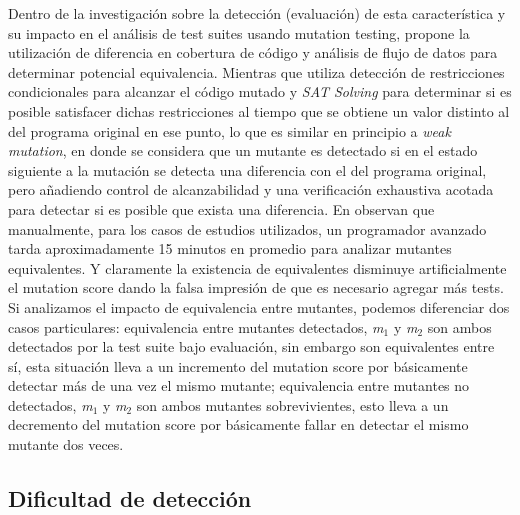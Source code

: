 Dentro de la investigaci\'on sobre la detecci\'on (evaluaci\'on) de esta caracter\'istica y su impacto en el an\'alisis de test suites usando mutation testing, \cite{biblography.mutation.evaluation.equivalent.Schuler+10} propone la utilizaci\'on de diferencia en cobertura de c\'odigo y an\'alisis de flujo de datos para determinar potencial equivalencia. Mientras que  \cite{biblography.mutation.evaluation.equivalent.Just+13} utiliza detecci\'on de restricciones condicionales para alcanzar el c\'odigo mutado y \emph{SAT Solving} para determinar si es posible satisfacer dichas restricciones al tiempo que se obtiene un valor distinto al del programa original en ese punto, lo que es similar en principio a \emph{weak mutation}, en donde se considera que un mutante es detectado si en el estado siguiente a la mutaci\'on se detecta una diferencia con el del programa original, pero a\~nadiendo control de alcanzabilidad y una verificaci\'on exhaustiva acotada para detectar si es posible que exista una diferencia.
En \cite{biblography.mutation.evaluation.equivalent.Grun+09} observan que manualmente, para los casos de estudios utilizados, un programador avanzado tarda aproximadamente 15 minutos en promedio para analizar mutantes equivalentes. Y claramente la existencia de equivalentes disminuye artificialmente el mutation score dando la falsa impresi\'on de que es necesario agregar m\'as tests. Si analizamos el impacto de equivalencia entre mutantes, podemos diferenciar dos casos particulares: equivalencia entre mutantes detectados, \emph{m$_1$} y \emph{m$_2$} son ambos detectados por la test suite bajo evaluaci\'on, sin embargo son equivalentes entre s\'i, esta situaci\'on lleva a un incremento del mutation score por b\'asicamente detectar m\'as de una vez el mismo mutante; equivalencia entre mutantes no detectados, \emph{m$_1$} y \emph{m$_2$} son ambos mutantes sobrevivientes, esto lleva a un decremento del mutation score por b\'asicamente fallar en detectar el mismo mutante dos veces.

\subsection{Dificultad de detecci\'on}

